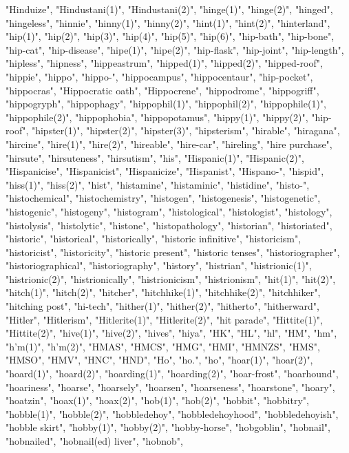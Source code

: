 "Hinduize",
"Hindustani(1)",
"Hindustani(2)",
"hinge(1)",
"hinge(2)",
"hinged",
"hingeless",
"hinnie",
"hinny(1)",
"hinny(2)",
"hint(1)",
"hint(2)",
"hinterland",
"hip(1)",
"hip(2)",
"hip(3)",
"hip(4)",
"hip(5)",
"hip(6)",
"hip-bath",
"hip-bone",
"hip-cat",
"hip-disease",
"hipe(1)",
"hipe(2)",
"hip-flask",
"hip-joint",
"hip-length",
"hipless",
"hipness",
"hippeastrum",
"hipped(1)",
"hipped(2)",
"hipped-roof",
"hippie",
"hippo",
"hippo-",
"hippocampus",
"hippocentaur",
"hip-pocket",
"hippocras",
"Hippocratic oath",
"Hippocrene",
"hippodrome",
"hippogriff",
"hippogryph",
"hippophagy",
"hippophil(1)",
"hippophil(2)",
"hippophile(1)",
"hippophile(2)",
"hippophobia",
"hippopotamus",
"hippy(1)",
"hippy(2)",
"hip-roof",
"hipster(1)",
"hipster(2)",
"hipster(3)",
"hipsterism",
"hirable",
"hiragana",
"hircine",
"hire(1)",
"hire(2)",
"hireable",
"hire-car",
"hireling",
"hire purchase",
"hirsute",
"hirsuteness",
"hirsutism",
"his",
"Hispanic(1)",
"Hispanic(2)",
"Hispanicise",
"Hispanicist",
"Hispanicize",
"Hispanist",
"Hispano-",
"hispid",
"hiss(1)",
"hiss(2)",
"hist",
"histamine",
"histaminic",
"histidine",
"histo-",
"histochemical",
"histochemistry",
"histogen",
"histogenesis",
"histogenetic",
"histogenic",
"histogeny",
"histogram",
"histological",
"histologist",
"histology",
"histolysis",
"histolytic",
"histone",
"histopathology",
"historian",
"historiated",
"historic",
"historical",
"historically",
"historic infinitive",
"historicism",
"historicist",
"historicity",
"historic present",
"historic tenses",
"historiographer",
"historiographical",
"historiography",
"history",
"histrian",
"histrionic(1)",
"histrionic(2)",
"histrionically",
"histrionicism",
"histrionism",
"hit(1)",
"hit(2)",
"hitch(1)",
"hitch(2)",
"hitcher",
"hitchhike(1)",
"hitchhike(2)",
"hitchhiker",
"hitching post",
"hi-tech",
"hither(1)",
"hither(2)",
"hitherto",
"hitherward",
"Hitler",
"Hitlerism",
"Hitlerite(1)",
"Hitlerite(2)",
"hit parade",
"Hittite(1)",
"Hittite(2)",
"hive(1)",
"hive(2)",
"hives",
"hiya",
"HK",
"HL",
"hl",
"HM",
"hm",
"h'm(1)",
"h'm(2)",
"HMAS",
"HMCS",
"HMG",
"HMI",
"HMNZS",
"HMS",
"HMSO",
"HMV",
"HNC",
"HND",
"Ho",
"ho.",
"ho",
"hoar(1)",
"hoar(2)",
"hoard(1)",
"hoard(2)",
"hoarding(1)",
"hoarding(2)",
"hoar-frost",
"hoarhound",
"hoariness",
"hoarse",
"hoarsely",
"hoarsen",
"hoarseness",
"hoarstone",
"hoary",
"hoatzin",
"hoax(1)",
"hoax(2)",
"hob(1)",
"hob(2)",
"hobbit",
"hobbitry",
"hobble(1)",
"hobble(2)",
"hobbledehoy",
"hobbledehoyhood",
"hobbledehoyish",
"hobble skirt",
"hobby(1)",
"hobby(2)",
"hobby-horse",
"hobgoblin",
"hobnail",
"hobnailed",
"hobnail(ed) liver",
"hobnob",
